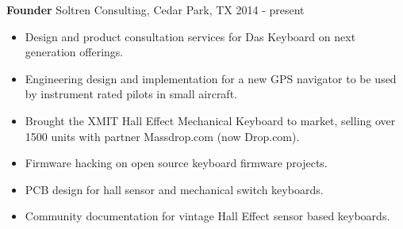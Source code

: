 \textbf{Founder}
Soltren Consulting, Cedar Park, TX \hfill 2014 - present

\begin{itemize} \itemsep -2pt

\item Design and product consultation services for Das Keyboard on
      next generation offerings.
\item Engineering design and implementation for a new GPS navigator
      to be used by instrument rated pilots in small aircraft.
\item Brought the XMIT Hall Effect Mechanical Keyboard to market,
      selling over 1500 units with partner Massdrop.com (now Drop.com).
\item Firmware hacking on open source keyboard firmware projects.
\item PCB design for hall sensor and mechanical switch keyboards.
\item Community documentation for vintage Hall Effect sensor based
      keyboards.

\end{itemize}
